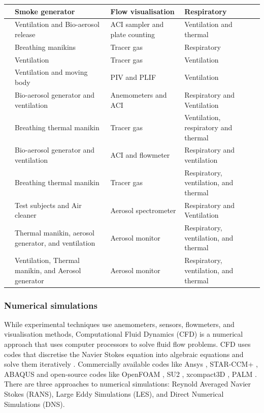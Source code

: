 \documentclass[a4paper,12pt]{elsarticle}
\begin{document}
\begin{center}
\begin{longtable}{|m{3.55cm}|m{3.5cm}|m{3.5cm}|m{3.5cm}|}
    \hline
    \citet{giri2022colliding}& Smoke generator & Flow visualisation & Respiratory\\
    \hline
    \citet{liu2020experimental}& Ventilation and Bio-aerosol release & ACI sampler and plate counting & Ventilation and thermal \\
    \hline
    \citet{qian2008dispersion}& Breathing manikins & Tracer gas & Respiratory\\
    \hline
    \citet{lu2020reducing}& Ventilation & Tracer gas & Ventilation\\
    \hline
    \citet{poussou2010flow}& Ventilation and moving body & PIV and PLIF & Ventilation \\
    \hline
    \citet{liu2020full}& Bio-aerosol generator and ventilation & Anemometers and ACI & Respiratory and Ventilation \\
    \hline
    \citet{cheng2021experimental}& Breathing thermal manikin & Tracer gas & Ventilation, respiratory and thermal\\
    \hline
    \citet{liu2023estimating}& Bio-aerosol generator and ventilation & ACI and flowmeter & Respiratory and ventilation \\
    \hline
    \citet{li2021effects}& Breathing thermal manikin & Tracer gas & Respiratory, ventilation, and thermal\\
    \hline
    \citet{duill2021impact}& Test subjects and Air cleaner &  Aerosol spectrometer & Respiratory and Ventilation\\
    \hline
    \citet{zhou2021experimental}& Thermal manikin, aerosol generator, and ventilation  & Aerosol monitor & Respiratory, ventilation, and thermal \\
    \hline
    \citet{zhang2019distribution}& Ventilation, Thermal manikin, and Aerosol generator & Aerosol monitor & Respiratory, ventilation, and thermal\\
    \hline
\end{longtable}
\end{center}

\subsubsection{Numerical simulations}

While experimental techniques use anemometers, sensors, flowmeters, and visualisation methods, Computational Fluid Dynamics (CFD) is a numerical approach that uses computer processors to solve fluid flow problems. CFD uses codes that discretise the Navier Stokes equation into algebraic equations and solve them iteratively \cite{ferziger2002computational}. Commercially available codes like Ansys \cite{ANSYS}, STAR-CCM+ \cite{starccm}, ABAQUS \cite{abaqus} and open-source codes like OpenFOAM \cite{openfoam}, SU2 \cite{su2}, xcompact3D \cite{xcompact3d}, PALM \cite{palm}. There are three approaches to numerical simulations: Reynold Averaged Navier Stokes (RANS), Large Eddy Simulations (LES), and Direct Numerical Simulations (DNS).
\end{document}
